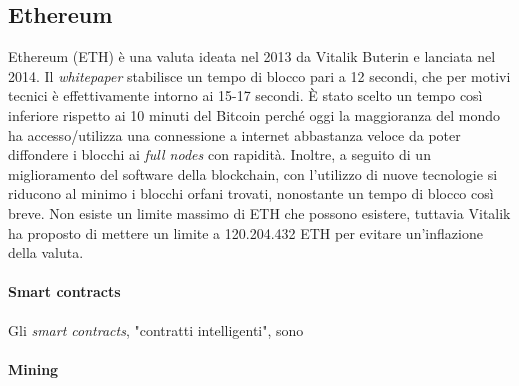 \documentclass {article}
\begin{document}
\subsection {Ethereum}


Ethereum (ETH) è una valuta ideata nel 2013 da Vitalik Buterin e lanciata nel 2014.
Il \textit{whitepaper} stabilisce un tempo di blocco pari a 12 secondi, che per motivi tecnici è effettivamente intorno ai 15-17 secondi.
È stato scelto un tempo così inferiore rispetto ai 10 minuti del Bitcoin perché oggi la maggioranza del mondo ha accesso/utilizza una connessione a internet abbastanza veloce da poter diffondere i blocchi ai \textit{full nodes} con rapidità.
Inoltre, a seguito di un miglioramento del software della blockchain, con l'utilizzo di nuove tecnologie si riducono al minimo i blocchi orfani trovati, nonostante un tempo di blocco così breve.
Non esiste un limite massimo di ETH che possono esistere, tuttavia Vitalik ha proposto di mettere un limite a 120.204.432 ETH per evitare un'inflazione della valuta.

\paragraph {Smart contracts}

Gli \textit{smart contracts}, "contratti intelligenti", sono

\paragraph {Mining}
\end{document}
